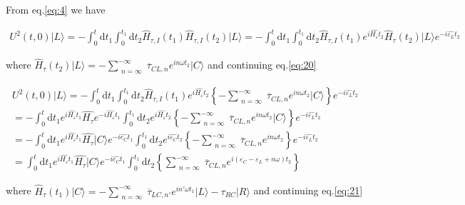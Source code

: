 From eq.\ref{eq:4} we have

\begin{multline} \label{eq:20}
U^{2}(t,0) \vert L \rangle =  - \int_{0}^{t} \mathrm{d}t_1 \int_{0}^{t_1} \mathrm{d}t_2  \widehat{H}_{\tau,I} (t_1) \widehat{H}_{\tau,I} (t_2) \vert L \rangle =
 - \int_{0}^{t} \mathrm{d}t_1 \int_{0}^{t_1} \mathrm{d}t_2  \widehat{H}_{\tau,I} (t_1) e^{i\widehat{H_{\varepsilon}}t_2}  \widehat{H}_{\tau} (t_2) \vert L \rangle e^{-i\widehat{\varepsilon_{L}}t_2} 
\end{multline}

where  $\widehat{H}_{\tau} (t_2) \vert L \rangle = - \sum_{\substack{n=\infty}}^{-\infty} \overline{\tau}_{CL,n} e^{i n \omega t_2}  \vert C \rangle$ and continuing eq.\ref{eq:20} 

\begin{multline} \label{eq:21}
U^{2}(t,0) \vert L \rangle = -\int_{0}^{t} \mathrm{d}t_1 \int_{0}^{t_1} \mathrm{d}t_2  \widehat{H}_{\tau,I} (t_1) e^{i\widehat{H_{\varepsilon}}t_2} \left\lbrace - \sum_{\substack{n=\infty}}^{-\infty} \overline{\tau}_{CL,n} e^{i n \omega t_2}  \vert C \rangle \right\rbrace  e^{-i\widehat{\varepsilon_{L}}t_2} 
\\
= - \int_{0}^{t} \mathrm{d}t_1  e^{i\widehat{H_{\varepsilon}}t_1} \widehat{H_{\tau}} e^{-i\widehat{H_{\varepsilon}}t_1} \int_{0}^{t_1} \mathrm{d}t_2  e^{i\widehat{H_{\varepsilon}}t_2} \left\lbrace  - \sum_{\substack{n=\infty}}^{-\infty} \overline{\tau}_{CL,n} e^{i n \omega t_2}  \vert C \rangle \right\rbrace   e^{-i\widehat{\varepsilon_{L}}t_2} 
\\
= - \int_{0}^{t} \mathrm{d}t_1  e^{i\widehat{H_{\varepsilon}}t_1} \widehat{H_{\tau}}\vert C \rangle e^{-i\widehat{e_{C}}t_1} \int_{0}^{t_1} \mathrm{d}t_2  e^{i\widehat{\varepsilon_{C}}t_2} \left\lbrace - \sum_{\substack{n=\infty}}^{-\infty}  \overline{\tau}_{CL,n} e^{i n \omega t_2}  \right\rbrace  e^{-i\widehat{\varepsilon_{L}}t_2} 
\\
=\int_{0}^{t} \mathrm{d}t_1  e^{i\widehat{H_{\varepsilon}}t_1} \widehat{H_{\tau}} \vert C \rangle e^{-i\widehat{e_{C}}t_1} \int_{0}^{t_1} \mathrm{d}t_2   \left\lbrace \sum_{\substack{n=\infty}}^{-\infty} \overline{\tau}_{CL,n} e^{i(\varepsilon_C -\varepsilon_L + n \omega )t_2} \right\rbrace
\end{multline}

where  $\widehat{H}_{\tau} (t_1) \vert C \rangle = - \sum_{\substack{n=\infty}}^{-\infty} \overline{\tau}_{LC,n'} e^{i n' \omega t_1}  \vert L \rangle - \tau_{RC} \vert R \rangle $ and continuing eq.\ref{eq:21}


